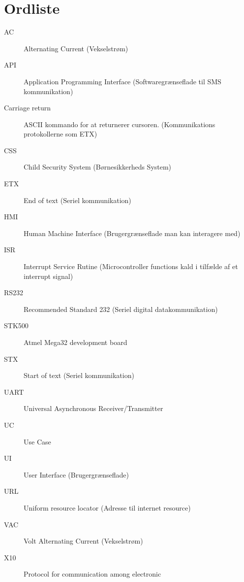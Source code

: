 \chapter{Ordliste}

\begin{description}

\item[AC] Alternating Current (Vekselstrøm)
\item[API] Application Programming Interface (Softwaregrænseflade til SMS kommunikation)
\item[Carriage return] ASCII kommando for at returnerer cursoren. (Kommunikations protokollerne som ETX)
\item[CSS] Child Security System (Børnesikkerheds System)
\item[ETX] End of text (Seriel kommunikation)
\item[HMI] Human Machine Interface (Brugergrænseflade man kan interagere med)
\item[ISR] Interrupt Service Rutine (Microcontroller functions kald i tilfælde af et interrupt signal)
\item[RS232] Recommended Standard 232 (Seriel digital datakommunikation)
\item[STK500] Atmel Mega32 development board
\item[STX] Start of text (Seriel kommunikation)
\item[UART] Universal Asynchronous Receiver/Transmitter
\item[UC] Use Case
\item[UI] User Interface (Brugergrænseflade)
\item[URL] Uniform resource locator (Adresse til internet resource)
\item[VAC] Volt Alternating Current (Vekselstrøm)
\item[X10] Protocol for communication among electronic

\end{description}
